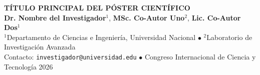 \documentclass[final]{article}
\begin{document}
\pagestyle{empty}

\begin{tcolorbox}[colback=secondary, colframe=primary, boxrule=4mm, arc=8mm]
  \centering
  \vspace{0.8cm}
  {\fontsize{64}{76}\selectfont \bfseries \color{white} TÍTULO PRINCIPAL DEL PÓSTER CIENTÍFICO}\\[1.5cm]
  {\fontsize{38}{46}\selectfont \color{primary} \textbf{Dr. Nombre del Investigador}$^1$, \textbf{MSc. Co-Autor Uno}$^2$, \textbf{Lic. Co-Autor Dos}$^1$}\\[1cm]
  {\fontsize{28}{36}\selectfont \color{gray!40} $^1$Departamento de Ciencias e Ingeniería, Universidad Nacional \quad $\bullet$ \quad $^2$Laboratorio de Investigación Avanzada}\\[0.6cm]
  {\fontsize{24}{30}\selectfont \color{accent} Contacto: \texttt{investigador@universidad.edu} \quad $\bullet$ \quad Congreso Internacional de Ciencia y Tecnología 2026}
  \vspace{0.8cm}
\end{tcolorbox}

\vspace{1.5cm}
\end{document}
